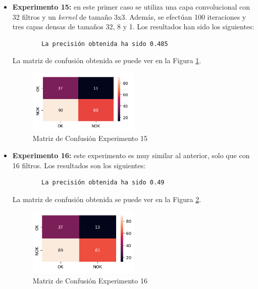 \begin{itemize}
    \item \textbf{Experimento 15:} en este primer caso se utiliza una capa convolucional con 32 filtros y un \emph{kernel} de tamaño 3x3. Además, se efectúan 100 iteraciones y tres capas densas de tamaños 32, 8 y 1. Los resultados han sido los siguientes:
    \begin{verbatim}
        La precisión obtenida ha sido 0.485
    \end{verbatim}
    La matriz de confusión obtenida se puede ver en la Figura \ref{f:exp15}.
    \begin{figure}[h]
     \centering
      \includegraphics[width=0.5\textwidth]{img/exp15.PNG}
     \caption{Matriz de Confusión Experimento 15}
     \label{f:exp15}
    \end{figure}
    
    \item \textbf{Experimento 16:} este experimento es muy similar al anterior, solo que con 16 filtros. Los resultados son los siguientes:
    \begin{verbatim}
        La precisión obtenida ha sido 0.49
    \end{verbatim}
    La matriz de confusión obtenida se puede ver en la Figura \ref{f:exp16}.
    \begin{figure}[h]
     \centering
      \includegraphics[width=0.5\textwidth]{img/exp16.PNG}
     \caption{Matriz de Confusión Experimento 16}
     \label{f:exp16}
    \end{figure}
    

\end{itemize}
